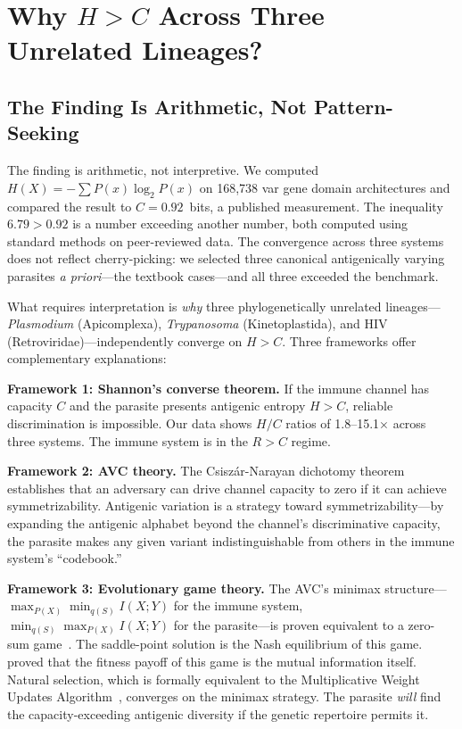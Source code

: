 \documentclass[twocolumn,10pt]{article}
\begin{document}
\section{Why $H > C$ Across Three Unrelated Lineages?}
\label{sec:why}

\subsection{The Finding Is Arithmetic, Not Pattern-Seeking}

The finding is arithmetic, not interpretive.  We computed $H(X) = -\sum P(x) \log_2 P(x)$ on 168,738 var gene domain architectures and compared the result to $C = 0.92$~bits, a published measurement.  The inequality $6.79 > 0.92$ is a number exceeding another number, both computed using standard methods on peer-reviewed data.  The convergence across three systems does not reflect cherry-picking: we selected three canonical antigenically varying parasites \emph{a priori}---the textbook cases---and all three exceeded the benchmark.

What requires interpretation is \emph{why} three phylogenetically unrelated lineages---\textit{Plasmodium} (Apicomplexa), \textit{Trypanosoma} (Kinetoplastida), and HIV (Retroviridae)---independently converge on $H > C$.  Three frameworks offer complementary explanations:

\textbf{Framework 1: Shannon's converse theorem.}  If the immune channel has capacity $C$ and the parasite presents antigenic entropy $H > C$, reliable discrimination is impossible.  Our data shows $H/C$ ratios of 1.8--15.1$\times$ across three systems.  The immune system is in the $R > C$ regime.

\textbf{Framework 2: AVC theory.}  The Csisz\'{a}r-Narayan dichotomy theorem establishes that an adversary can drive channel capacity to zero if it can achieve symmetrizability.  Antigenic variation is a strategy toward symmetrizability---by expanding the antigenic alphabet beyond the channel's discriminative capacity, the parasite makes any given variant indistinguishable from others in the immune system's ``codebook.''

\textbf{Framework 3: Evolutionary game theory.}  The AVC's minimax structure---$\max_{P(X)} \min_{q(S)} I(X;Y)$ for the immune system, $\min_{q(S)} \max_{P(X)} I(X;Y)$ for the parasite---is proven equivalent to a zero-sum game~\citep{gallager1968,vonneumann1928}.  The saddle-point solution is the Nash equilibrium of this game.  \citet{bergstrom2005} proved that the fitness payoff of this game is the mutual information itself.  Natural selection, which is formally equivalent to the Multiplicative Weight Updates Algorithm~\citep{chastain2014}, converges on the minimax strategy.  The parasite \emph{will} find the capacity-exceeding antigenic diversity if the genetic repertoire permits it.
\end{document}
